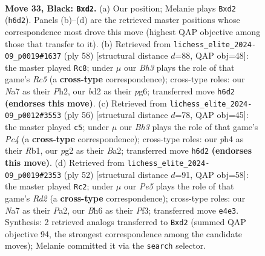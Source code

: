 \documentclass[11pt]{article}
\begin{document}
\clearpage

\begin{figure}[p]\centering
\begin{subfigure}{0.46\textwidth}\centering
\resizebox{\linewidth}{!}{%
\newchessgame
\chessboard[
  setfen={1r6/n3rk2/p2p2pb/3P3p/Rpq1p2P/7R/1Q1BNPP1/5K2 b - - 2 33},
  showmover=false,
  pgfstyle=straightmove, color=movearrow, markmove={h6-d2}
]}
\caption{}
\end{subfigure}\hfill
\begin{subfigure}{0.46\textwidth}\centering
\resizebox{\linewidth}{!}{%
\newchessgame
\chessboard[
  setfen={3r2k1/1q1P2bp/p5p1/P1R5/5p2/1PP1n3/3Q2PP/5R1K w - - 1 30},
  showmover=false,
  pgfstyle=straightmove, color=movearrow, markmove={c5-c8}
]}
\caption{}
\end{subfigure}
\\[4pt]
\begin{subfigure}{0.46\textwidth}\centering
\resizebox{\linewidth}{!}{%
\newchessgame
\chessboard[
  setfen={5r2/1r1b1ppk/2p4p/p3pP2/2P1P2q/4R2P/BP1Q2P1/1R5K w - - 1 29},
  showmover=false,
  pgfstyle=straightmove, color=movearrow, markmove={c4-c5}
]}
\caption{}
\end{subfigure}\hfill
\begin{subfigure}{0.46\textwidth}\centering
\resizebox{\linewidth}{!}{%
\newchessgame
\chessboard[
  setfen={2b1r2k/p5pp/1pp1Pq2/3r4/3PQpB1/5P2/PP1R3P/3R3K w - - 6 27},
  showmover=false,
  pgfstyle=straightmove, color=movearrow, markmove={d2-c2}
]}
\caption{}
\end{subfigure}
\caption{\textbf{Move 33, Black: \texttt{Bxd2}.} (a) Our position; Melanie plays \texttt{Bxd2} (\texttt{h6d2}). Panels (b)--(d) are the retrieved master positions whose correspondence most drove this move (highest QAP objective among those that transfer to it). (b) Retrieved from \texttt{lichess\_elite\_2024-09\_p0019\#1637} (ply 58) [structural distance $d$=88, QAP obj=48]: the master played \texttt{Rc8}; under $\mu$ our \emph{Bh3} plays the role of that game's \emph{Rc5} (a \textbf{cross-type} correspondence); cross-type roles: our \emph{N}a7 as their \emph{P}h2, our \emph{b}d2 as their \emph{p}g6; transferred move \texttt{h6d2} \textbf{(endorses this move)}. (c) Retrieved from \texttt{lichess\_elite\_2024-09\_p0012\#3553} (ply 56) [structural distance $d$=78, QAP obj=45]: the master played \texttt{c5}; under $\mu$ our \emph{Bh3} plays the role of that game's \emph{Pc4} (a \textbf{cross-type} correspondence); cross-type roles: our \emph{p}h4 as their \emph{R}b1, our \emph{p}g2 as their \emph{B}a2; transferred move \texttt{h6d2} \textbf{(endorses this move)}. (d) Retrieved from \texttt{lichess\_elite\_2024-09\_p0019\#2353} (ply 52) [structural distance $d$=91, QAP obj=58]: the master played \texttt{Rc2}; under $\mu$ our \emph{Pe5} plays the role of that game's \emph{Rd2} (a \textbf{cross-type} correspondence); cross-type roles: our \emph{N}a7 as their \emph{P}a2, our \emph{B}h6 as their \emph{P}f3; transferred move \texttt{e4e3}. Synthesis: 2 retrieved analogs transferred to \texttt{Bxd2} (summed QAP objective 94, the strongest correspondence among the candidate moves); Melanie committed it via the \texttt{search} selector.}
\label{fig:thought-m65}
\end{figure}
\end{document}
